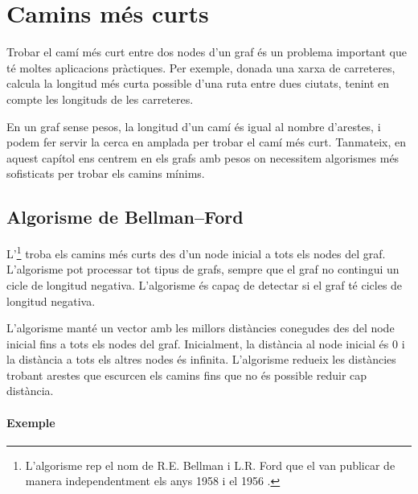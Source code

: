 \chapter{Camins més curts}


Trobar el camí més curt entre dos nodes d'un graf és un problema
important que té moltes aplicacions pràctiques. Per exemple, donada
una xarxa de carreteres, calcula la longitud més curta possible d'una
ruta entre dues ciutats, tenint en compte les longituds de les
carreteres.

En un graf sense pesos, la longitud d'un camí és igual al nombre
d'arestes, i podem fer servir la cerca en amplada per trobar el camí
més curt. Tanmateix, en aquest capítol ens centrem en els grafs amb
pesos on necessitem algorismes més sofisticats per trobar els camins
mínims.

\section{Algorisme de Bellman–Ford}


L'\footnote{L'algorisme rep el nom de
R.E. Bellman i L.R. Ford que el van publicar de manera independentment
els anys 1958 i el 1956 \cite{bel58,for56a}.} troba els camins més
curts des d'un node inicial a tots els nodes del graf. L'algorisme pot
processar tot tipus de grafs, sempre que el graf no contingui un cicle
de longitud negativa. L'algorisme és capaç de detectar si el graf té
cicles de longitud negativa.

L'algorisme manté un vector amb les millors distàncies conegudes des
del node inicial fins a tots els nodes del graf. Inicialment, la
distància al node inicial és 0 i la distància a tots els altres nodes
és infinita. L'algorisme redueix les distàncies trobant arestes que
escurcen els camins fins que no és possible reduir cap distància.

\subsubsection{Exemple}


